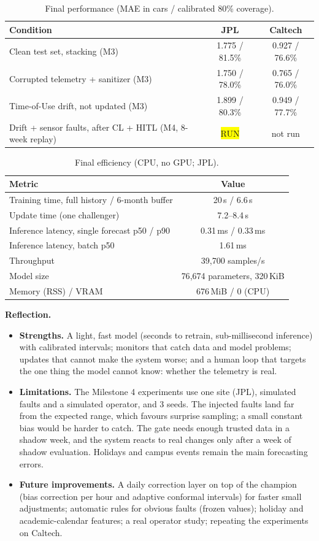 \documentclass[11pt,letterpaper]{article}
\newcommand{\run}{\colorbox{yellow}{\footnotesize RUN}}
\begin{document}
\begin{table}[H]
\centering\small
\caption{Final performance (MAE in cars / calibrated 80\% coverage).}
\begin{tabular}{@{}lcc@{}}
\toprule
Condition & JPL & Caltech \\
\midrule
Clean test set, stacking (M3) & 1.775 / 81.5\% & 0.927 / 76.6\% \\
Corrupted telemetry + sanitizer (M3) & 1.750 / 78.0\% & 0.765 / 76.0\% \\
Time-of-Use drift, not updated (M3) & 1.899 / 80.3\% & 0.949 / 77.7\% \\
Drift + sensor faults, after CL + HITL (M4, 8-week replay) & \run & not run \\
\bottomrule
\end{tabular}
\end{table}

\begin{table}[H]
\centering\small
\caption{Final efficiency (CPU, no GPU; JPL).}
\begin{tabular}{@{}lc@{}}
\toprule
Metric & Value \\
\midrule
Training time, full history / 6-month buffer & 20\,s / 6.6\,s \\
Update time (one challenger) & 7.2--8.4\,s \\
Inference latency, single forecast p50 / p90 & 0.31\,ms / 0.33\,ms \\
Inference latency, batch p50 & 1.61\,ms \\
Throughput & 39{,}700 samples/s \\
Model size & 76{,}674 parameters, 320\,KiB \\
Memory (RSS) / VRAM & 676\,MiB / 0 (CPU) \\
\bottomrule
\end{tabular}
\end{table}

\textbf{Reflection.}
\begin{itemize}
  \item \textbf{Strengths.} A light, fast model (seconds to retrain, sub-millisecond inference) with calibrated
  intervals; monitors that catch data and model problems; updates that cannot make the system worse; and a human loop
  that targets the one thing the model cannot know: whether the telemetry is real.
  \item \textbf{Limitations.} The Milestone 4 experiments use one site (JPL), simulated faults and a simulated operator,
  and 3 seeds. The injected faults land far from the expected range, which favours surprise sampling; a small constant
  bias would be harder to catch. The gate needs enough trusted data in a shadow week, and the system reacts to real
  changes only after a week of shadow evaluation. Holidays and campus events remain the main forecasting errors.
  \item \textbf{Future improvements.} A daily correction layer on top of the champion (bias correction per hour and
  adaptive conformal intervals) for faster small adjustments; automatic rules for obvious faults (frozen values);
  holiday and academic-calendar features; a real operator study; repeating the experiments on Caltech.
\end{itemize}
\end{document}

